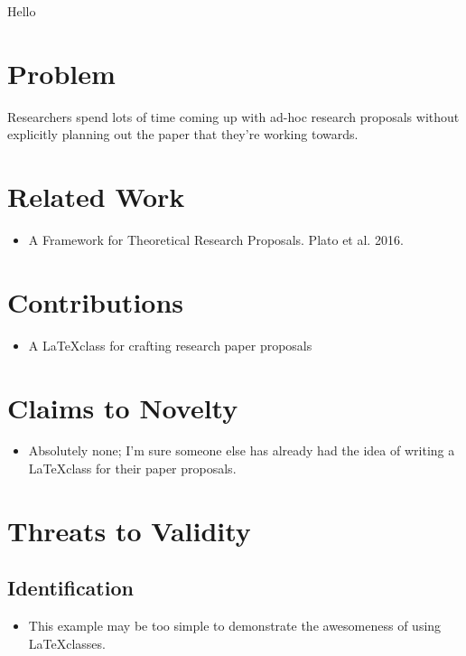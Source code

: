 \documentclass{paper_proposal}
\begin{document}

Hello

\section{Problem}
Researchers spend lots of time coming up with ad-hoc research proposals
without explicitly planning out the paper that they're working towards.

\section{Related Work}
\begin{itemize}
  \item A Framework for Theoretical Research Proposals. Plato et al. 2016.
\end{itemize}

\section{Contributions}
\begin{itemize}
  \item A \LaTeX class for crafting research paper proposals
\end{itemize}

%
\section{Claims to Novelty}
\begin{itemize}
  \item Absolutely none; I'm sure someone else has already had the idea of
    writing a \LaTeX class for their paper proposals.
\end{itemize}

\section{Threats to Validity}

\subsection{Identification}
\begin{itemize}
  \item This example may be too simple to demonstrate the awesomeness of using
    \LaTeX classes.
\end{itemize}
\end{document}
